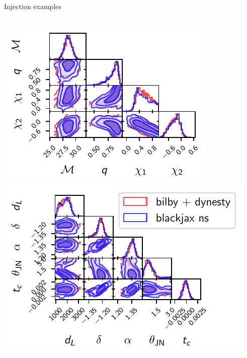 \documentclass[aspectratio=169, 11pt]{beamer}
\begin{document}
\begin{frame}{Injection examples}
\vspace{2em}
    \begin{columns}
        \includegraphics[]{Ca_Foscari Beamer/bilby_dynesty_blackjax_comparison_9param_intrinsic.pdf}
        \hspace{-3em}
        \includegraphics[]{Ca_Foscari Beamer/bilby_dynesty_blackjax_comparison_9param_extrinsic.pdf}
    \end{columns}
\end{frame}
\end{document}
